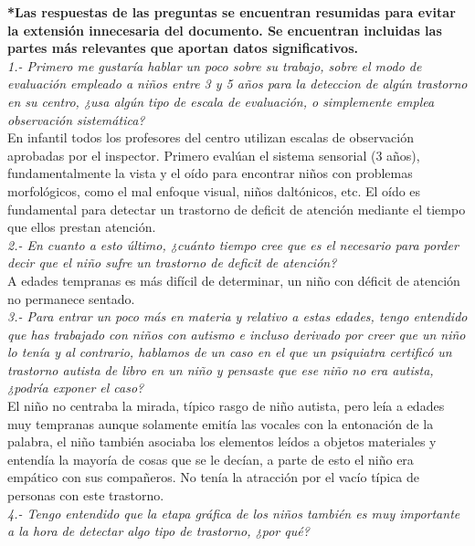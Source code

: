 \documentclass[letterpaper,12pt]{article}
\begin{document}
	\textbf{*Las respuestas de las preguntas se encuentran resumidas para
evitar la extensión innecesaria del documento. Se encuentran
incluidas las partes más relevantes que aportan datos
significativos.} \\

\textit{1.- Primero me gustaría hablar un poco sobre su trabajo, sobre el modo de evaluación empleado a niños entre 3 y 5 años para la deteccion de algún
trastorno en su centro, ¿usa algún tipo de escala de evaluación, o
simplemente emplea observación sistemática?}\\

En infantil todos los profesores del centro utilizan escalas de observación
aprobadas por el inspector. Primero evalúan el sistema sensorial (3 años),
fundamentalmente la vista y el oído para encontrar niños con problemas
morfológicos, como el mal enfoque visual, niños daltónicos, etc. El oído es
fundamental para detectar un trastorno de deficit de atención mediante el
tiempo que ellos prestan atención.\\

\textit{2.- En cuanto a esto último, ¿cuánto tiempo cree que es el necesario para porder decir que el niño sufre un trastorno de deficit de atención?}\\

A edades tempranas es más difícil de determinar, un niño con déficit de
atención no permanece sentado.\\

\textit{3.- Para entrar un poco más en materia y relativo a estas edades, tengo entendido que has trabajado con niños con autismo e incluso derivado por
creer que un niño lo tenía y al contrario, hablamos de un caso en el que un
psiquiatra certificó un trastorno autista de libro en un niño y pensaste que
ese niño no era autista, ¿podría exponer el caso?}\\

El niño no centraba la mirada, típico rasgo de niño autista, pero leía a edades muy tempranas aunque solamente emitía las vocales con la entonación de la palabra, el niño también asociaba los elementos leídos a objetos materiales
y entendía la mayoría de cosas que se le decían, a parte de esto el niño era
empático con sus compañeros. No tenía la atracción por el vacío típica de
personas con este trastorno.\\

\textit{4.- Tengo entendido que la etapa gráfica de los niños también es muy
importante a la hora de detectar algo tipo de trastorno, ¿por qué?} \\
\end{document}

